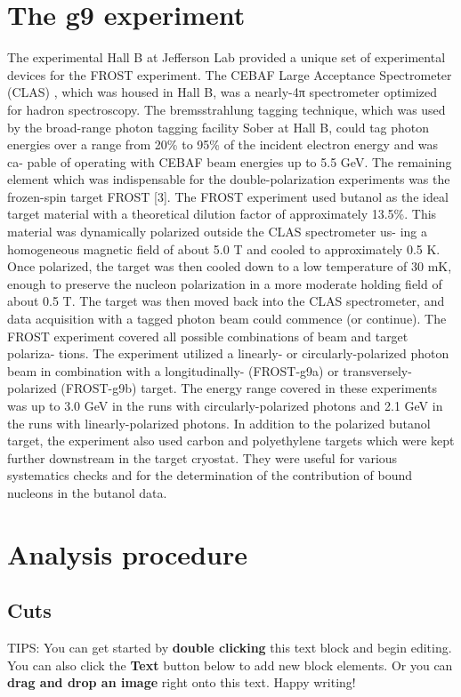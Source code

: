 
\tableofcontents

\section{The g9 experiment}
The experimental Hall B at Jefferson Lab provided a unique set of experimental devices for the
FROST experiment. The CEBAF Large Acceptance Spectrometer (CLAS)\cite{CLAS} , which was housed
in Hall B, was a nearly-4π spectrometer optimized for hadron spectroscopy. The bremsstrahlung
tagging technique, which was used by the broad-range photon tagging facility Sober\cite{Sober_2000} at Hall B, could
tag photon energies over a range from 20\% to 95\% of the incident electron energy and was ca-
pable of operating with CEBAF beam energies up to 5.5 GeV. The remaining element which was
indispensable for the double-polarization experiments was the frozen-spin target FROST [3]. The
FROST experiment used butanol as the ideal target material with a theoretical dilution factor of
approximately 13.5\%. This material was dynamically polarized outside the CLAS spectrometer us-
ing a homogeneous magnetic field of about 5.0 T and cooled to approximately 0.5 K. Once polarized,
the target was then cooled down to a low temperature of 30 mK, enough to preserve the nucleon
polarization in a more moderate holding field of about 0.5 T. The target was then moved back
into the CLAS spectrometer, and data acquisition with a tagged photon beam could commence (or
continue). The FROST experiment covered all possible combinations of beam and target polariza-
tions. The experiment utilized a linearly- or circularly-polarized photon beam in combination with
a longitudinally- (FROST-g9a) or transversely-polarized (FROST-g9b) target. The energy range
covered in these experiments was up to 3.0 GeV in the runs with circularly-polarized photons and
2.1 GeV in the runs with linearly-polarized photons. In addition to the polarized butanol target,
the experiment also used carbon and polyethylene targets which were kept further downstream in
the target cryostat. They were useful for various systematics checks and for the determination of
the contribution of bound nucleons in the butanol data.

\section{Analysis procedure}
\subsection{Cuts}



TIPS:
You can get started by \textbf{double clicking} this text block and begin editing. You can also click the \textbf{Text} button below to add new block elements. Or you can \textbf{drag and drop an image} right onto this text. Happy writing!
